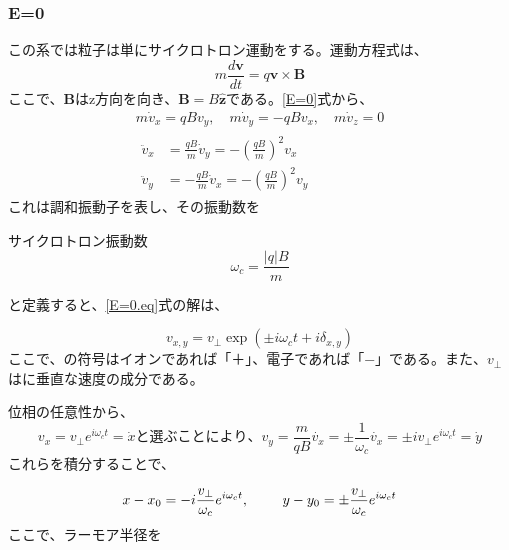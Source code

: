 \documentclass{ltjsarticle}
\numberwithin{equation}{section} %
\begin{document}
\subsubsection{E=0}
この系では粒子は単にサイクロトロン運動をする。運動方程式は、
\begin{equation}
  m\frac{d\bm{v}}{dt} = q\bm{v}\times \bm{B} \label{E=0}
\end{equation}
ここで、$\bm{B}$はz方向を向き、$\bm{B}=B\bm{\hat{z}}$である。\eqref{E=0}式から、
\begin{equation}
\begin{gathered}
  m\dot{v}_x = qB v_y, \quad
  m\dot{v}_y = -qB v_x, \quad
  m\dot{v}_z = 0 \\
  \begin{aligned}
    \ddot{v}_x &= \frac{qB}{m}\dot{v}_y = -\left(\frac{qB}{m}\right)^2 v_x \\
    \ddot{v}_y &= -\frac{qB}{m}\dot{v}_x = -\left(\frac{qB}{m}\right)^2 v_y \label{E=0.eq}
  \end{aligned}
\end{gathered}
\end{equation} 
これは調和振動子を表し、その振動数を

\begin{eqbox}{サイクロトロン振動数}
\begin{equation}
  \omega_c = \frac{|q|B}{m} \label{cyclon}
\end{equation}
\end{eqbox}  
と定義すると、\eqref{E=0.eq}式の解は、

\[
v_{x,y} = v_\perp \exp(\pm i\omega_ct + i\delta_{x,y})
\]
ここで、\pm の符号はイオンであれば「＋」、電子であれば「−」である。また、$v_\perp$はに垂直な速度の成分である。

位相の任意性から、
\begin{subequations}
  \begin{equation}
    v_x = v_\perp e^{i\omega_c t} = \dot{x} \label{normal.x}
  \end{equation}
と選ぶことにより、
  \begin{equation}
    v_y = \frac{m}{qB}\dot{v_x} = \pm \frac{1}{\omega_c}\dot{v_x} = \pm iv_\perp e^{i\omega_c t} = \dot{y} \label{normal.y}
  \end{equation}
\end{subequations}
これらを積分することで、

\begin{equation}
  x - x_0 = -i\frac{v_\perp}{\omega_c}e^{i\omega_c t}, \hspace{2pc} y -y_0 = \pm \frac{v_\perp}{\omega_c}e^{i\omega_c t} \label{larmor.eq}
\end{equation}
ここで、ラーモア半径を
\end{document}
